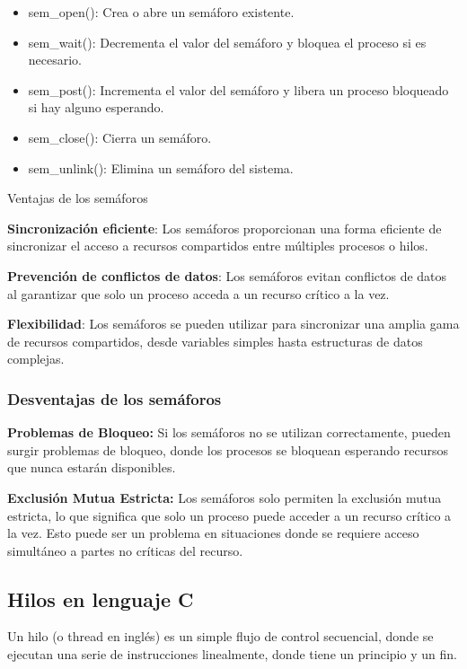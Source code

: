 \begin{itemize}
	\item sem\_open(): Crea o abre un semáforo existente.
	\item sem\_wait(): Decrementa el valor del semáforo y bloquea el proceso si es necesario.
	\item sem\_post(): Incrementa el valor del semáforo y libera un proceso bloqueado si hay alguno esperando.
	\item sem\_close(): Cierra un semáforo.
	\item sem\_unlink(): Elimina un semáforo del sistema.
\end{itemize}

Ventajas de los semáforos

\textbf{Sincronización eficiente}: Los semáforos proporcionan una forma eficiente de sincronizar el acceso a recursos compartidos entre múltiples procesos o hilos.

\textbf{Prevención de conflictos de datos}: Los semáforos evitan conflictos de datos al garantizar que solo un proceso acceda a un recurso crítico a la vez.

\textbf{Flexibilidad}: Los semáforos se pueden utilizar para sincronizar una amplia gama de recursos compartidos, desde variables simples hasta estructuras de datos complejas.

\subsubsection{Desventajas de los semáforos}

\textbf{Problemas de Bloqueo:} Si los semáforos no se utilizan correctamente, pueden surgir problemas de bloqueo, donde los procesos se bloquean esperando recursos que nunca estarán disponibles.

\textbf{Exclusión Mutua Estricta:} Los semáforos solo permiten la exclusión mutua estricta, lo que significa que solo un proceso puede acceder a un recurso crítico a la vez. Esto puede ser un problema en situaciones donde se requiere acceso simultáneo a partes no críticas del recurso.

\subsection{Hilos en lenguaje C}

Un hilo (o thread en inglés) es un simple flujo de control secuencial, donde se ejecutan una serie de instrucciones linealmente, donde tiene un principio y un fin.

